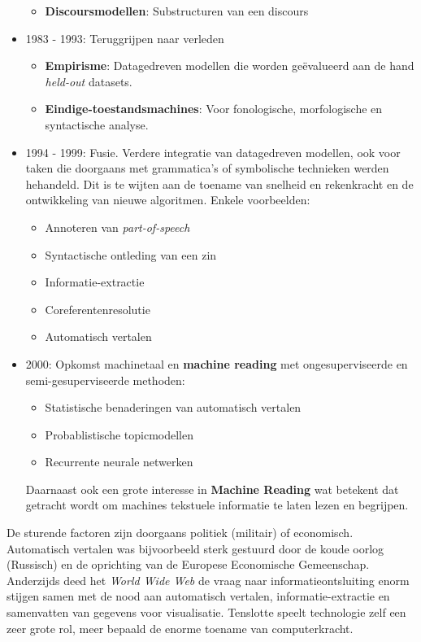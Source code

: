 \documentclass[../main.tex]{subfiles}
\begin{document}
\begin{solution}
\begin{itemize}
\begin{itemize}
		\item \textbf{Discoursmodellen}: Substructuren van een discours
	\end{itemize}
	\item 1983 - 1993: Teruggrijpen naar verleden
	\begin{itemize}
		\item \textbf{Empirisme}: Datagedreven modellen die worden ge\"evalueerd aan de hand \emph{held-out} datasets.
		\item \textbf{Eindige-toestandsmachines}: Voor fonologische, morfologische en syntactische analyse.
	\end{itemize}
	\item 1994 - 1999: Fusie. Verdere integratie van datagedreven modellen, ook voor taken die doorgaans met grammatica's of symbolische technieken werden hehandeld. Dit is te wijten aan de toename van snelheid en rekenkracht en de ontwikkeling van nieuwe algoritmen. Enkele voorbeelden:
	\begin{multicols}{2}
		\begin{itemize}
			\item Annoteren van \emph{part-of-speech}
			\item Syntactische ontleding van een zin
			\item Informatie-extractie
			\item Coreferentenresolutie
			\item Automatisch vertalen
		\end{itemize}
	\end{multicols}
	\item 2000: Opkomst machinetaal en \textbf{machine reading} met ongesuperviseerde en semi-gesuperviseerde methoden:
	\begin{itemize}
		\item Statistische benaderingen van automatisch vertalen
		\item Probablistische topicmodellen
		\item Recurrente neurale netwerken
	\end{itemize}
	Daarnaast ook een grote interesse in \textbf{Machine Reading} wat betekent dat getracht wordt om machines tekstuele informatie te laten lezen en begrijpen.
\end{itemize}
De sturende factoren zijn doorgaans politiek (militair) of economisch. Automatisch vertalen was bijvoorbeeld sterk gestuurd door de koude oorlog (Russisch) en de oprichting van de Europese Economische Gemeenschap. Anderzijds deed het \emph{World Wide Web} de vraag naar informatieontsluiting enorm stijgen samen met de nood aan automatisch vertalen, informatie-extractie en samenvatten van gegevens voor visualisatie. Tenslotte speelt technologie zelf een zeer grote rol, meer bepaald de enorme toename van computerkracht.
\end{solution}
\end{document}
